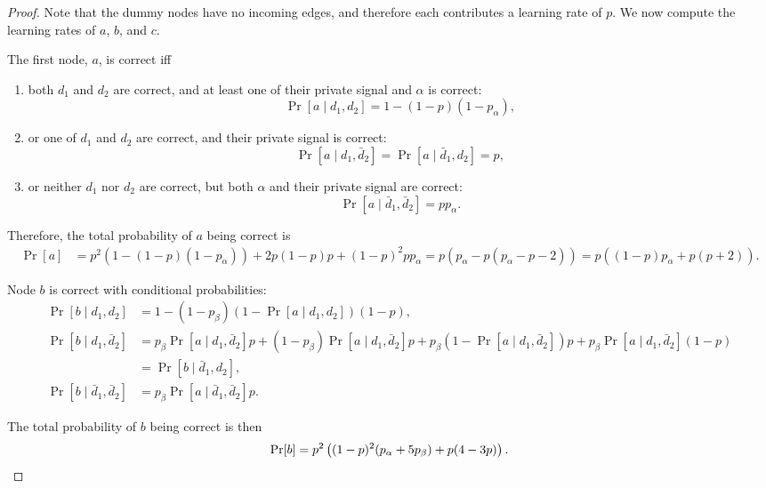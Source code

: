 \begin{proof}
     Note that the dummy nodes have no incoming edges, and therefore each contributes a learning rate of $p$. We now compute the learning rates of $ a $, $ b $, and $ c $.
    
     

    The first node, $a$, is correct iff \begin{enumerate}[ ]
        \item both $d_1$ and $d_2$ are correct, and at least one of their private signal and $\alpha$ is correct: \[
        \Pr[a \mid d_1, d_2] = 1 - (1-p)(1-p_\alpha),
        \]
        \item or one of $d_1$ and $d_2$ are correct, and their private signal is correct: \[
        \Pr[a \mid d_1, \bar d_2] = \Pr[a \mid \bar d_1, d_2] = p,
        \]
        \item or neither $d_1$ nor $d_2$ are correct, but both $\alpha$ and their private signal are correct: \[
        \Pr[a \mid \bar d_1, \bar d_2] = pp_\alpha.
        \]
	\end{enumerate}

	Therefore, the total probability of $a$ being correct is \begin{align*}
            \Pr[a] &= p^2 \left( 1-(1-p)(1-p_\alpha) \right) + 2p(1-p)p + (1-p)^2pp_\alpha = p (p_\alpha- p(p_\alpha -p-2))= p((1-p)p_\alpha + p(p+2)).
	\end{align*}
    
    Node $b$ is correct with conditional probabilities:
    \begin{align*}
        \Pr[b \mid d_1, d_2] &= 1 - (1-p_\beta)(1-\Pr[a \mid d_1, d_2])(1-p), \\
        \Pr[b \mid d_1, \bar d_2] &= p_\beta\Pr[a \mid d_1, \bar d_2]p + (1-p_\beta)\Pr[a \mid d_1, \bar d_2]p + p_\beta(1-\Pr[a \mid d_1, \bar d_2])p + p_\beta\Pr[a \mid d_1, \bar d_2](1-p) \\
                                  & = \Pr[b \mid \bar d_1, d_2], \\
        \Pr[b \mid \bar d_1, \bar d_2] &= p_\beta\Pr[a \mid \bar d_1, \bar d_2]p.
    \end{align*}

    The total probability of $b$ being correct is then \[
	\Pr\!\left[ b \right] = p^2 \left((1-p)^2 (p_\alpha + 5{p_\beta})+p (4-3 p)\right).
    \]


\end{proof}

